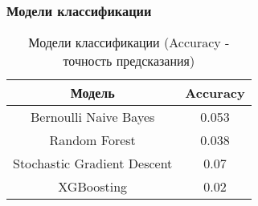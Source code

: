 \subsubsection{Модели классификации}

\begin{table}[H]
  \centering
  \begin{tabular} { | c | c | }
    \hline
    Модель & Accuracy \\
    \hline
    Bernoulli Naive Bayes & 0.053 \\
    Random Forest & 0.038 \\
    Stochastic Gradient Descent & 0.07 \\
    XGBoosting & 0.02 \\
    \hline
  \end{tabular}
  \caption{Модели классификации (Accuracy - точность предсказания)}
\end{table}
